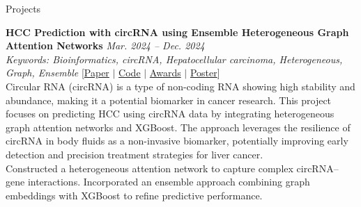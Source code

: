 \documentclass{resume}
\begin{document}
\begin{rSection}{Projects}

\textbf{HCC Prediction with circRNA using Ensemble Heterogeneous Graph Attention Networks} \hfill \textit{Mar. 2024 -- Dec. 2024} \\
\hspace*{0.5em} \textit{Keywords: Bioinformatics, circRNA, Hepatocellular carcinoma, Heterogeneous, Graph, Ensemble}
[\href{https://drive.google.com/file/d/14Jb0DGuJ3rtw9oVpDX8h-zFtCXwUOFBz/view?usp=drive_link}{Paper} $|$ 
\href{https://github.com/janghana/HCC-Prediction-with-circRNA-using-Ensemble-Heterogeneous-Graph-Attention-Networks}{Code} $|$ 
\href{https://drive.google.com/file/d/1wL0qKHLMqsJQ5L3oL_iSEl03YpwCQRZw/view}{Awards} $|$ 
\href{https://drive.google.com/file/d/1mUGoFzGKtcTUVR2UUFi4breL0e4KBnFk/view}{Poster}] \\
\hspace*{1em} Circular RNA (circRNA) is a type of non-coding RNA showing high stability and abundance, making it a potential biomarker in cancer research. This project focuses on predicting HCC using circRNA data by integrating heterogeneous graph attention networks and XGBoost. The approach leverages the resilience of circRNA in body fluids as a non-invasive biomarker, potentially improving early detection and precision treatment strategies for liver cancer. \\
\hspace*{1em} Constructed a heterogeneous attention network to capture complex circRNA–gene interactions.  
\hspace*{1em} Incorporated an ensemble approach combining graph embeddings with XGBoost to refine predictive performance.


\end{rSection}
\end{document}
